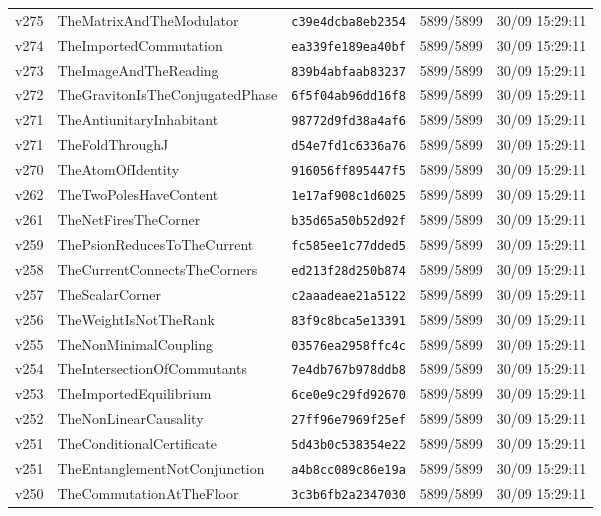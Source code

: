 \documentclass[11pt]{article}
\theoremstyle{definition}\newtheorem{deriv}{Derivation}
\begin{document}
{\begin{longtable}{@{}lllll@{}}
v275 & TheMatrixAndTheModulator & \texttt{c39e4dcba8eb2354} & 5899/5899 & 30/09 15:29:11 \\
v274 & TheImportedCommutation & \texttt{ea339fe189ea40bf} & 5899/5899 & 30/09 15:29:11 \\
v273 & TheImageAndTheReading & \texttt{839b4abfaab83237} & 5899/5899 & 30/09 15:29:11 \\
v272 & TheGravitonIsTheConjugatedPhase & \texttt{6f5f04ab96dd16f8} & 5899/5899 & 30/09 15:29:11 \\
v271 & TheAntiunitaryInhabitant & \texttt{98772d9fd38a4af6} & 5899/5899 & 30/09 15:29:11 \\
v271 & TheFoldThroughJ & \texttt{d54e7fd1c6336a76} & 5899/5899 & 30/09 15:29:11 \\
v270 & TheAtomOfIdentity & \texttt{916056ff895447f5} & 5899/5899 & 30/09 15:29:11 \\
v262 & TheTwoPolesHaveContent & \texttt{1e17af908c1d6025} & 5899/5899 & 30/09 15:29:11 \\
v261 & TheNetFiresTheCorner & \texttt{b35d65a50b52d92f} & 5899/5899 & 30/09 15:29:11 \\
v259 & ThePsionReducesToTheCurrent & \texttt{fc585ee1c77dded5} & 5899/5899 & 30/09 15:29:11 \\
v258 & TheCurrentConnectsTheCorners & \texttt{ed213f28d250b874} & 5899/5899 & 30/09 15:29:11 \\
v257 & TheScalarCorner & \texttt{c2aaadeae21a5122} & 5899/5899 & 30/09 15:29:11 \\
v256 & TheWeightIsNotTheRank & \texttt{83f9c8bca5e13391} & 5899/5899 & 30/09 15:29:11 \\
v255 & TheNonMinimalCoupling & \texttt{03576ea2958ffc4c} & 5899/5899 & 30/09 15:29:11 \\
v254 & TheIntersectionOfCommutants & \texttt{7e4db767b978ddb8} & 5899/5899 & 30/09 15:29:11 \\
v253 & TheImportedEquilibrium & \texttt{6ce0e9c29fd92670} & 5899/5899 & 30/09 15:29:11 \\
v252 & TheNonLinearCausality & \texttt{27ff96e7969f25ef} & 5899/5899 & 30/09 15:29:11 \\
v251 & TheConditionalCertificate & \texttt{5d43b0c538354e22} & 5899/5899 & 30/09 15:29:11 \\
v251 & TheEntanglementNotConjunction & \texttt{a4b8cc089c86e19a} & 5899/5899 & 30/09 15:29:11 \\
v250 & TheCommutationAtTheFloor & \texttt{3c3b6fb2a2347030} & 5899/5899 & 30/09 15:29:11 \\

\end{longtable}}
\end{document}
